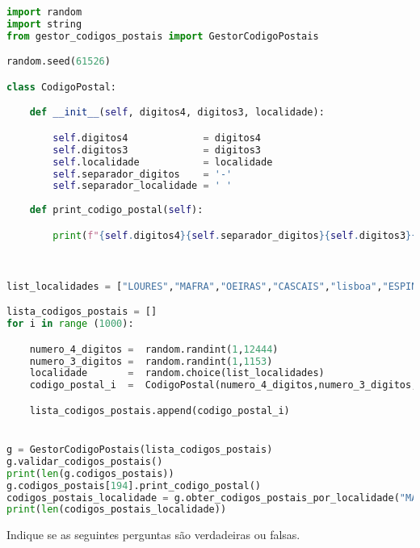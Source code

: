 \documentclass[12pt,varwidth=16cm,border=17pt]{standalone}
\begin{document}
\begin{lstlisting}[language=Python]
import random
import string
from gestor_codigos_postais import GestorCodigoPostais

random.seed(61526)

class CodigoPostal:

    def __init__(self, digitos4, digitos3, localidade):

        self.digitos4             = digitos4
        self.digitos3             = digitos3
        self.localidade           = localidade
        self.separador_digitos    = '-'
        self.separador_localidade = ' '
    
    def print_codigo_postal(self):

        print(f"{self.digitos4}{self.separador_digitos}{self.digitos3}{self.separador_localidade}{self.localidade}")

        

list_localidades = ["LOURES","MAFRA","OEIRAS","CASCAIS","lisboa","ESPINHO","MAIA","Amarante","valongo","OVAR","Pombal","Batalha"]

lista_codigos_postais = []
for i in range (1000):

    numero_4_digitos =  random.randint(1,12444)
    numero_3_digitos =  random.randint(1,1153)
    localidade       =  random.choice(list_localidades)
    codigo_postal_i  =  CodigoPostal(numero_4_digitos,numero_3_digitos,localidade)

    lista_codigos_postais.append(codigo_postal_i)


g = GestorCodigoPostais(lista_codigos_postais)
g.validar_codigos_postais()
print(len(g.codigos_postais))
g.codigos_postais[194].print_codigo_postal()
codigos_postais_localidade = g.obter_codigos_postais_por_localidade("MAFRA")
print(len(codigos_postais_localidade))
\end{lstlisting}

Indique se as seguintes perguntas são verdadeiras ou falsas.
\end{document}
